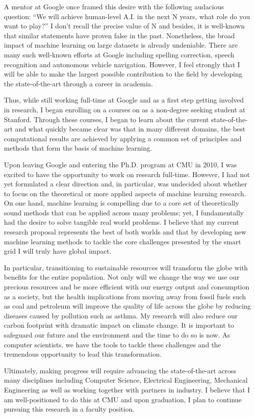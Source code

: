 \documentclass[12pt]{article}
\begin{document}
A mentor at Google once framed this desire with the following audacious question: ``We will achieve human-level A.I. in the next N years, what role do you want to play?'' I don't recall the precise value of N  and besides, it is well-known that similar statements have proven false in the past. Nonetheless, the broad impact of machine learning on large datasets is already undeniable. There are many such well-known efforts at Google including spelling correction, speech recognition and autonomous vehicle navigation. However, I feel strongly that I will be able to make the largest possible contribution to the field by developing the state-of-the-art through a career in academia.

Thus, while still working full-time at Google and as a first step getting involved in research, I began enrolling on a courses on as a non-degree seeking student at Stanford. Through these courses, I began to learn about the current state-of-the-art and what quickly became clear was that in many different domains, the best computational results are achieved by applying a common set of principles and methods that form the basis of machine learning.

Upon leaving Google and entering the Ph.D. program at CMU in 2010, I was excited to have the opportunity to work on research full-time. However, I had not yet formulated a clear direction and, in particular, was undecided about whether to focus on the theoretical or more applied aspects of machine learning research. On one hand, machine learning is compelling due to a core set of theoretically sound methods that can be applied across many problems; yet, I fundamentally had the desire to solve tangible real world problems. I believe that my current research proposal represents the best of both worlds and that by developing new machine learning methods to tackle the core challenges presented by the smart grid I will truly have global impact.

In particular, transitioning to sustainable resources will transform the globe with benefits for the entire population. Not only will we change the way we use our precious resources and be more efficient with our energy output and consumption as a society, but the health implications from moving away from fossil fuels such as coal and petroleum will improve the quality of life across the globe by reducing diseases caused by pollution such as asthma. My research will also reduce our carbon footprint with dramatic impact on climate change.  It is important to safeguard our future and the environment and the time to do so is now. As computer scientists, we have the tools to tackle these challenges and the tremendous opportunity to lead this transformation.

Ultimately, making progress will require advancing the state-of-the-art across many disciplines including Computer Science, Electrical Engineering, Mechanical Engineering as well as working together with partners in industry. I believe that I am well-positioned to do this at CMU and upon graduation, I plan to continue pursuing this research in a faculty position.

\renewcommand{\refname}{\vskip -1.5cm}
\footnotesize


\end{document}
